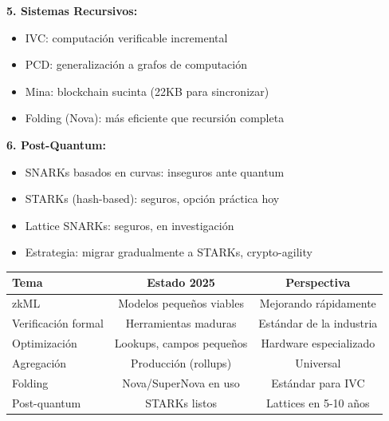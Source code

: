 \documentclass[11pt,a4paper,twoside]{book}
\begin{document}
\begin{keyidea}
\textbf{5. Sistemas Recursivos:}
\begin{itemize}
    \item IVC: computaci\'on verificable incremental
    \item PCD: generalizaci\'on a grafos de computaci\'on
    \item Mina: blockchain sucinta (22KB para sincronizar)
    \item Folding (Nova): m\'as eficiente que recursi\'on completa
\end{itemize}

\textbf{6. Post-Quantum:}
\begin{itemize}
    \item SNARKs basados en curvas: inseguros ante quantum
    \item STARKs (hash-based): seguros, opci\'on pr\'actica hoy
    \item Lattice SNARKs: seguros, en investigaci\'on
    \item Estrategia: migrar gradualmente a STARKs, crypto-agility
\end{itemize}
\end{keyidea}

\begin{center}
\begin{tabular}{lcc}
\toprule
\textbf{Tema} & \textbf{Estado 2025} & \textbf{Perspectiva} \\
\midrule
zkML & Modelos peque\~nos viables & Mejorando r\'apidamente \\
Verificaci\'on formal & Herramientas maduras & Est\'andar de la industria \\
Optimizaci\'on & Lookups, campos peque\~nos & Hardware especializado \\
Agregaci\'on & Producci\'on (rollups) & Universal \\
Folding & Nova/SuperNova en uso & Est\'andar para IVC \\
Post-quantum & STARKs listos & Lattices en 5-10 a\~nos \\
\bottomrule
\end{tabular}
\end{center}
\end{document}

